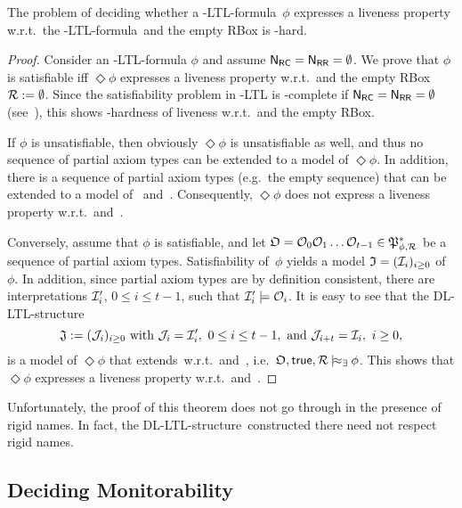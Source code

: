 \begin{theorem}
    The problem of deciding whether a \SHOQ-LTL-formula~$\phi$ expresses a
    liveness property w.r.t.~the \SHOQ-LTL-formula~\true and the empty RBox is
    \ExpTime-hard.
\end{theorem}

\begin{proof}
    Consider an \ALC-LTL-formula $\phi$ and assume $\mathsf{N_{RC}}=\mathsf{N_{RR}}=\emptyset$.  We
    prove that $\phi$ is satisfiable iff $\Diamond\phi$ expresses a liveness
    property w.r.t.~\true and the empty RBox $\mathcal{R}:=\emptyset$.  Since the
    satisfiability problem in \ALC-LTL is \ExpTime-complete if
    $\mathsf{N_{RC}}=\mathsf{N_{RR}}=\emptyset$ (see~\cite{BaGL-ToCL12}), this shows \ExpTime-hardness
    of liveness w.r.t.~\true and the empty RBox.

    If $\phi$ is unsatisfiable, then obviously $\Diamond\phi$ is unsatisfiable
    as well, and thus no sequence of partial axiom types can be extended to a
    model of $\Diamond\phi$.  In addition, there is a sequence of partial axiom
    types (e.g.~the empty sequence) that can be extended to a model of~\true
    and~\Rmc.  Consequently, $\Diamond\phi$ does not express a liveness property
    w.r.t.~\true and~\Rmc.

    Conversely, assume that $\phi$ is satisfiable, and let
    $\mathfrak{O}=\mathcal{O}_0\mathcal{O}_1\dots\mathcal{O}_{t-1}\in\mathfrak{P}_{\phi,\mathcal{R}}^*$ be a sequence of
    partial axiom types.  Satisfiability of~$\phi$ yields a model
    $\mathfrak{I}=(\mathcal{I}_i)_{i\ge 0}$ of~$\phi$.  In addition, since partial axiom types
    are by definition consistent, there are interpretations $\mathcal{I}'_i$,
    $0\le i\le t-1$, such that $\mathcal{I}'_i\models\mathcal{O}_i$.  It is easy to see that
    the DL-LTL-structure
    \[\Jmf:=(\Jmc_i)_{i\ge 0}\ \text{with}\ \Jmc_i=\Imc'_i,\ 0\le i\le t-1,\
        \text{and}\ \Jmc_{i+t}=\Imc_i,\ i\ge 0,\]
    is a model of $\Diamond\phi$ that extends~\Omf w.r.t.~\true and~\Rmc,
    i.e.~$\Omf,\true,\Rmc\modelsex\phi$.  This shows that $\Diamond\phi$
    expresses a liveness property w.r.t.~\true and~\Rmc.
\end{proof}

\noindent
Unfortunately, the proof of this theorem does not go through in the presence of
rigid names.  In fact, the DL-LTL-structure~\Jmf constructed there need not
respect rigid names.


\subsection{Deciding Monitorability}\label{sec:monitorability}

